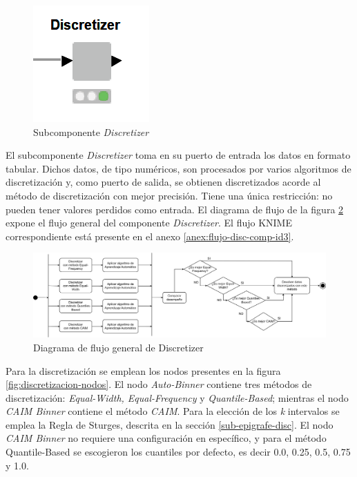 \begin{figure}[H]
	\centering
	\includegraphics[width=0.15\linewidth]{"figuras/capi 2/subcomp-disc"}
	\caption[Subcomponente Discretizer]{Subcomponente \textit{Discretizer}}
	\label{fig:subcomp-disc}
\end{figure}

El subcomponente \textit{Discretizer} toma en su puerto de entrada los datos en formato tabular. Dichos datos, de tipo numéricos, son procesados por varios algoritmos de discretización y, como puerto de salida, se obtienen discretizados acorde al método de discretización con mejor precisión. Tiene una única restricción: no pueden tener valores perdidos como entrada. El diagrama de flujo de la figura \ref{fig:discretizacion} expone el flujo general del componente \textit{Discretizer}. El flujo KNIME correspondiente está presente en el anexo \ref{anex:flujo-disc-comp-id3}.

\begin{figure}[H]
	\centering
	\includegraphics[width=1\linewidth]{"figuras/capi 2/preprocesado/discretizacion.drawio"}
	\caption{Diagrama de flujo general de Discretizer}
	\label{fig:discretizacion}
\end{figure}

Para la discretización se emplean los nodos presentes en la figura \ref{fig:discretizacion-nodos}. El nodo \textit{Auto-Binner} contiene tres métodos de discretización: \textit{Equal-Width, Equal-Frequency} y \textit{Quantile-Based}; mientras el nodo \textit{CAIM Binner} contiene el método \textit{CAIM}. Para la elección de los \textit{k} intervalos se emplea la Regla de Sturges, descrita en la sección \ref{sub-epigrafe-disc}. El nodo \textit{CAIM Binner} no requiere una configuración en específico, y para el método Quantile-Based se escogieron los cuantiles por defecto, es decir 0.0, 0.25, 0.5, 0.75 y 1.0.

